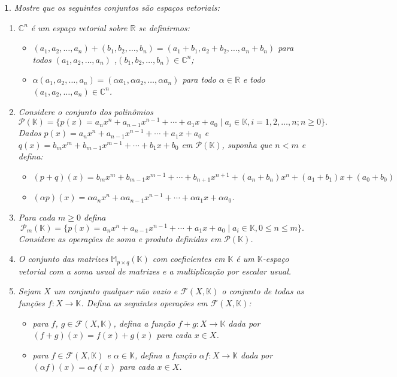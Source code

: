 \documentclass[12pt]{exam}
\newtheorem{exercicio}{}
\newcommand{\real}{\mathbb{R}}
\newcommand{\complex}{\mathbb{C}}
\newcommand{\cp}[1]{\mathbb{#1}}
\begin{document}
\begin{exercicio}
  Mostre que os seguintes conjuntos s\~ao espa\c{c}os vetoriais:
  \begin{enumerate}[label={\alph*})]
    \item $\complex^n$ \'e um espa\c{c}o vetorial sobre $\real$ se definirmos:
    \begin{itemize}
      \item $(a_1, a_2, \dots, a_n) + (b_1, b_2, \dots,b_n) = (a_1 + b_1, a_2 + b_2,\dots, a_n + b_n)$ para todos $(a_1, a_2, \dots,a_n)$ ,$(b_1, b_2, \dots,b_n) \in \complex^n$;
      \item $\alpha (a_1, a_2, \dots,a_n) = (\alpha a_1, \alpha a_2, \dots, \alpha a_n)$ para todo $\alpha \in \real$ e todo $(a_1, a_2, \dots, a_n) \in \complex^n$.
    \end{itemize}
    \item Considere o conjunto dos polin\^omios
    \[
      \mathcal{P}(\cp{K}) = \{ p(x) = a_nx^n + a_{n - 1}x^{n - 1} + \cdots + a_1x + a_0 \mid a_i \in \cp{K}, i = 1, 2, \dots, n; n \ge 0 \}.
    \]
    Dados $p(x) = a_nx^n + a_{n - 1}x^{n - 1} + \cdots + a_1x + a_0$ e $q(x) = b_mx^m + b_{m - 1}x^{m - 1} + \cdots + b_1x + b_0$ em $\mathcal{P}(\cp{K})$, suponha que $n < m$ e defina:
    \begin{itemize}
      \item $(p + q)(x) = b_mx^m + b_{m - 1}x^{m - 1} + \cdots + b_{n + 1}x^{n + 1} + (a_n + b_n)x^n + (a_1 + b_1)x + (a_0 + b_0)$
      \item $(\alpha p)(x) = \alpha a_nx^n + \alpha a_{n - 1}x^{n - 1} + \cdots + \alpha a_1x + \alpha a_0$.
    \end{itemize}

    \item Para cada $m \ge 0$ defina
    \[
      \mathcal{P}_m(\cp{K}) = \{ p(x) = a_nx^n + a_{n - 1}x^{n - 1} + \cdots + a_1x + a_0 \mid a_i \in \cp{K}, 0 \le n \le m \}.
    \]
     Considere as opera\c{c}\~oes de soma e produto definidas em $\mathcal{P}(\cp{K})$.

    \item O conjunto das matrizes $\cp{M}_{p \times q}(\cp{K})$ com coeficientes em $\cp{K}$ \'e um $\cp{K}$-espa\c{c}o vetorial com a soma usual de matrizes e a multiplica\c{c}\~ao por escalar usual.

    \item Sejam $X$ um conjunto qualquer n\~ao vazio e $\mathcal{F}(X, \cp{K})$ o conjunto de todas as fun\c{c}\~oes $f : X \to \cp{K}$. Defina as seguintes operações em $\mathcal{F}(X, \cp{K})$:
    \begin{itemize}
      \item  para $f$, $g \in \mathcal{F}(X, \cp{K})$, defina a fun\c{c}\~ao $f + g : X \to \cp{K}$ dada por $(f+g)(x) = f(x) + g(x)$ para cada $x \in X$.
      \item para $f \in \mathcal{F}(X, \cp{K})$ e $\alpha \in \cp{K}$, defina a fun\c{c}\~ao $\alpha f: X \to \cp{K}$ dada por $(\alpha f)(x) = \alpha f(x)$ para cada $x \in X$.
    \end{itemize}
  \end{enumerate}
\end{exercicio}
\end{document}

